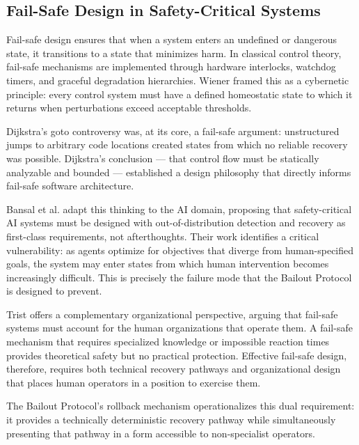 \subsection{Fail-Safe Design in Safety-Critical Systems}

Fail-safe design ensures that when a system enters an undefined or dangerous state, it transitions to a state that minimizes harm. In classical control theory, fail-safe mechanisms are implemented through hardware interlocks, watchdog timers, and graceful degradation hierarchies. Wiener \cite{wiener1948} framed this as a cybernetic principle: every control system must have a defined homeostatic state to which it returns when perturbations exceed acceptable thresholds.

Dijkstra's goto controversy \cite{dijkstra1982} was, at its core, a fail-safe argument: unstructured jumps to arbitrary code locations created states from which no reliable recovery was possible. Dijkstra's conclusion — that control flow must be statically analyzable and bounded — established a design philosophy that directly informs fail-safe software architecture.

Bansal et al. \cite{bansal2019} adapt this thinking to the AI domain, proposing that safety-critical AI systems must be designed with out-of-distribution detection and recovery as first-class requirements, not afterthoughts. Their work identifies a critical vulnerability: as agents optimize for objectives that diverge from human-specified goals, the system may enter states from which human intervention becomes increasingly difficult. This is precisely the failure mode that the Bailout Protocol is designed to prevent.

Trist \cite{tristr81} offers a complementary organizational perspective, arguing that fail-safe systems must account for the human organizations that operate them. A fail-safe mechanism that requires specialized knowledge or impossible reaction times provides theoretical safety but no practical protection. Effective fail-safe design, therefore, requires both technical recovery pathways and organizational design that places human operators in a position to exercise them.

The Bailout Protocol's rollback mechanism operationalizes this dual requirement: it provides a technically deterministic recovery pathway while simultaneously presenting that pathway in a form accessible to non-specialist operators.


